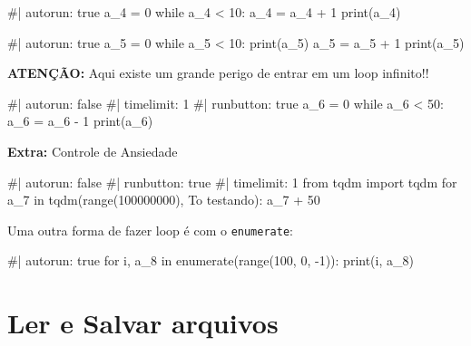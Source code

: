 \documentclass[
  letterpaper,
  DIV=11,
  numbers=noendperiod]{scrreprt}
\newenvironment{Shaded}{\begin{snugshade}}{\end{snugshade}}
\newcommand{\NormalTok}[1]{\textcolor[rgb]{0.00,0.23,0.31}{#1}}
\begin{document}
\begin{Shaded}
\begin{Highlighting}[]
\NormalTok{\#| autorun: true}
\NormalTok{a\_4 = 0}
\NormalTok{while a\_4 \textless{} 10:}
\NormalTok{    a\_4 = a\_4 + 1}
\NormalTok{    print(a\_4)}
\end{Highlighting}
\end{Shaded}

\begin{Shaded}
\begin{Highlighting}[]
\NormalTok{\#| autorun: true}
\NormalTok{a\_5 = 0}
\NormalTok{while a\_5 \textless{} 10:}
\NormalTok{    print(a\_5)}
\NormalTok{    a\_5 = a\_5 + 1}
\NormalTok{print(a\_5)}
\end{Highlighting}
\end{Shaded}

\textbf{ATENÇÃO:} Aqui existe um grande perigo de entrar em um loop
infinito!!

\begin{Shaded}
\begin{Highlighting}[]
\NormalTok{\#| autorun: false}
\NormalTok{\#| timelimit: 1}
\NormalTok{\#| runbutton: true}
\NormalTok{a\_6 = 0}
\NormalTok{while a\_6 \textless{} 50:}
\NormalTok{    a\_6 = a\_6 {-} 1}
\NormalTok{print(a\_6)}
\end{Highlighting}
\end{Shaded}

\textbf{Extra:} Controle de Ansiedade

\begin{Shaded}
\begin{Highlighting}[]
\NormalTok{\#| autorun: false}
\NormalTok{\#| runbutton: true}
\NormalTok{\#| timelimit: 1}
\NormalTok{from tqdm import tqdm}
\NormalTok{for a\_7 in tqdm(range(100000000), \textquotesingle{}To testando\textquotesingle{}):}
\NormalTok{    a\_7 + 50}
\end{Highlighting}
\end{Shaded}

Uma outra forma de fazer loop é com o \texttt{enumerate}:

\begin{Shaded}
\begin{Highlighting}[]
\NormalTok{\#| autorun: true}
\NormalTok{for i, a\_8 in enumerate(range(100, 0, {-}1)):}
\NormalTok{    print(i, a\_8)}
\end{Highlighting}
\end{Shaded}

\section{Ler e Salvar arquivos}\label{ler-e-salvar-arquivos}
\end{document}
